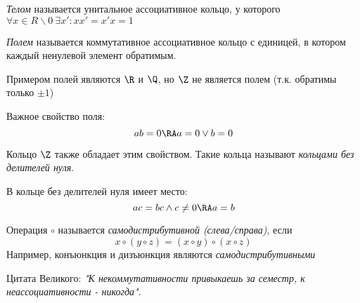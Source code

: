 \documentclass[a4paper, 14pt]{article}
\begin{document}
    \begin{definition}
        {\it Телом} называется унитальное ассоциативное кольцо, у которого $\forall x \in R\backslash{0} \ \exists x' : xx' = x'x = 1$    
    \end{definition}

    \begin{definition}
        {\it Полем} называется коммутативное ассоциативное кольцо с единицей,
        в котором каждый ненулевой элемент обратимым. 

        Примером полей являются $\R$ и $\Q$, но $\Z$ не является полем (т.к. обратимы только $\pm 1$)
    \end{definition}
    

    Важное свойство поля: \[ab = 0 \RA a = 0 \lor b = 0\]

    Кольцо $\Z$ также обладает этим свойством. Такие кольца называют 
    {\it кольцами без делителей нуля}.

    В кольце без делителей нуля имеет место:
    \[ac = bc \land c \neq 0 \RA a = b\]

    \begin{definition}
        Операция $\circ$ называется {\it самодистрибутивной (слева/справа)}, если
        \[x \circ (y \circ z) = (x \circ y) \circ (x \circ z)\]
        Например, конъюнкция и дизъюнкция являются {\it самодистрибутивными}
    \end{definition}
    
    

    Цитата Великого: {\it "К некоммутативности привыкаешь за семестр, к неассоциативности - никогда"}.
\end{document}
